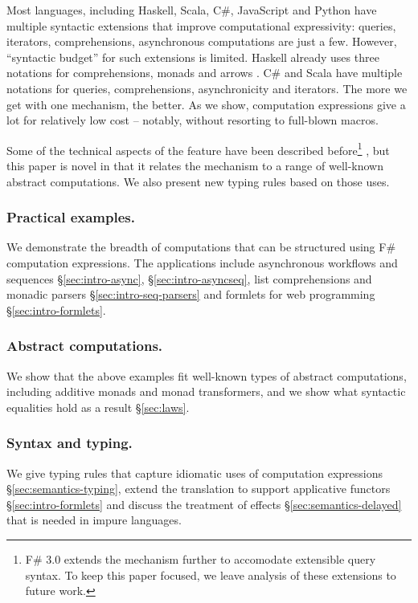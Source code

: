 \documentclass[runningheads,a4paper]{llncs}
\begin{document}
Most languages, including Haskell, Scala, C\#, JavaScript and Python have multiple
syntactic extensions that improve computational expressivity: queries, 
iterators, comprehensions, asynchronous computations are just a few. However,
``syntactic budget'' for such extensions is limited. Haskell already uses three notations
for comprehensions, monads and arrows \cite{arrows}. C\# and Scala have multiple notations
for queries, comprehensions, asynchronicity and iterators. The more we get with one 
mechanism, the better. As we show, computation expressions give a lot for relatively 
low cost -- notably, without resorting to full-blown macros.

Some of the technical aspects of the feature have been described before\footnote{F\# 3.0 extends the 
mechanism further to accomodate extensible query syntax. To keep this paper focused, we leave analysis 
of these extensions to future work.} \cite{fsharp-spec}, but this paper is novel in that it relates the mechanism to 
a range of well-known abstract computations. We also present new typing rules based on those uses.

\vspace{-1em}
\subsubsection{Practical examples.} 
We demonstrate the breadth of computations that can be structured using F\# computation expressions.
The applications include asynchronous workflows and sequences \S\ref{sec:intro-async}, 
\S\ref{sec:intro-asyncseq}, list comprehensions and monadic parsers \S\ref{sec:intro-seq-parsers}
and formlets for web programming \S\ref{sec:intro-formlets}.

\vspace{-1em}
\subsubsection{Abstract computations.} We show that the above examples fit well-known types
of abstract computations, including additive monads and monad transformers, and we show what 
syntactic equalities hold as a result \S\ref{sec:laws}.

\vspace{-1em}
\subsubsection{Syntax and typing.} We give typing rules that capture idiomatic uses of computation
expressions \S\ref{sec:semantics-typing}, extend the translation to support applicative functors 
\S\ref{sec:intro-formlets} and discuss the treatment of effects \S\ref{sec:semantics-delayed} that 
is needed in impure languages.
\end{document}
